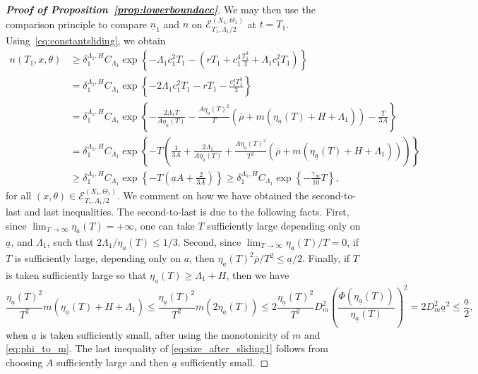 \documentclass[11pt]{article}    %
\begin{document}
\begin{proof}[{\bf Proof of Proposition~\ref{prop:lowerboundacc}}]
We may then use the comparison principle to compare $\underline n_1$ and $n$ on $\mathcal{E}_{T_1,\Lambda_1/2}^{(X_1,\Theta_1)}$ at $t=T_1$.  Using~\eqref{eq:constantsliding}, we obtain
\begin{equation}\label{eq:size_after_sliding1}
\begin{split}
	n(T_1, x, \theta)
		&\geq \delta_1^{\Lambda_1,H}
			C_{\Lambda_1}
			\exp\left\{ - \Lambda_1 c_1^2 T_1 - \left( r T_1 + c_1^4 \frac{T_1^3}{3} + \Lambda_1 c_1^2 T_1 \right) \right\}\\
		&= \delta_1^{\Lambda_1,H}
			C_{\Lambda_1}
			\exp\left\{ -  2\Lambda_1 c_1^2 T_1 - r T_1 - \frac{c_1^4T_1^3}{3} \right\}\\
		&= \delta_1^{\Lambda_1,H}
			C_{\Lambda_1}
			\exp\left\{ - \frac{2\Lambda_1 T}{A \eta_{\underline a}(T)} - \frac{A \eta_{\underline a}(T)^2}{T} \left( \overline\rho + m(\eta_{\underline a}(T) + H + \Lambda_1) \right) - \frac{T}{3A}\right\}\\
		&= \delta_1^{\Lambda_1,H}
			C_{\Lambda_1}
			\exp\left\{ - T \left(\frac{1}{3A} + \frac{2\Lambda_1}{A \eta_{\underline a}(T)} + \frac{A \eta_{\underline a}(T)^2}{T^2} \left( \overline\rho + m(\eta_{\underline a}(T) + H + \Lambda_1) \right) \right)\right\}\\
		&\geq \delta_1^{\Lambda_1,H} C_{\Lambda_1} \exp\left\{ - T\left(\underline aA + \frac{2}{3A}\right)\right\}
		\geq \delta_1^{\Lambda_1,H} C_{\Lambda_1} \exp\left\{ - \frac{\gamma_\infty}{10}T\right\},
\end{split}
\end{equation}
for all $(x,\theta) \in \mathcal{E}_{T_1,\Lambda_1/2}^{(X_1,\Theta_1)}$. We comment on how we have obtained the second-to-last and last inequalities. 
The second-to-last is due to the following facts. First, since $\lim_{T \to \infty}\eta_{\underline a}(T) = + \infty$, one can take $T$ sufficiently large depending only on $\underline{a}$, and $\Lambda_1$, such that $2\Lambda_1/\eta_{\underline a}(T) \leq 1/3$. Second, since $\lim_{T \to \infty}\eta_{\underline a}(T)/T =0$, if $T$ is sufficiently large, depending only on $a$, then $\eta_{\underline a}(T)^2 \overline\rho /T^2 \leq \underline{a}/2$. Finally, if $T$ is taken sufficiently large so that $\eta_{\underline a}(T) \geq \Lambda_1 + H$, then we  have 
\begin{equation*}
	\frac{\eta_{\underline a}(T)^2}{T^2} m(\eta_{\underline a}(T) + H + \Lambda_1)
		\leq \frac{\eta_{\underline a}(T)^2}{T^2} m(2\eta_{\underline a}(T))
		\leq 2\frac{\eta_{\underline a}(T)^2}{T^2} D_m^2 \left( \frac{\Phi(\eta_{\underline a}(T))}{\eta_{\underline a}(T)} \right)^2
		= 2 D_m^2 \underline{a}^2 \leq \frac{\underline{a}}{2},
\end{equation*}
when $\underline{a}$ is taken sufficiently small, after using the monotonicity of $m$ and \eqref{eq:phi_to_m}.  The last inequality of \eqref{eq:size_after_sliding1} follows from choosing $A$ sufficiently large and then $\underline{a}$ sufficiently small.


\end{proof}
\end{document}
